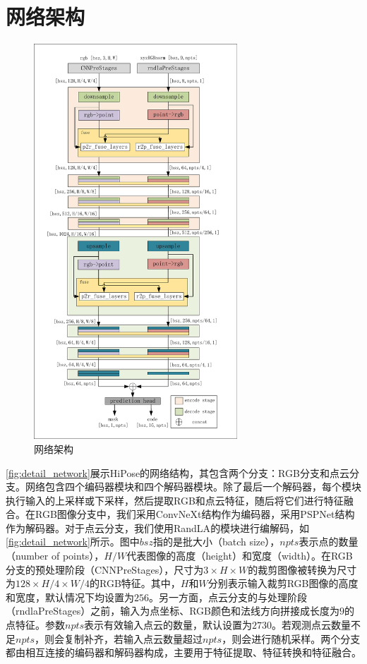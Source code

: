 \section{网络架构}

\begin{figure}[htbp]
    \centering
    \includegraphics[width=0.68\textwidth]{figure/hipose/network.pdf}
    \caption{网络架构}
    \label{fig:detail_network}
\end{figure}

\autoref{fig:detail_network}展示HiPose的网络结构，其包含两个分支：RGB分支和点云分支。网络包含四个编码器模块和四个解码器模块。除了最后一个解码器，每个模块执行输入的上采样或下采样，然后提取RGB和点云特征，随后将它们进行特征融合。在RGB图像分支中，我们采用ConvNeXt\cite{Liu2022ACF}结构作为编码器，采用PSPNet结构\cite{zhao2017pyramid}作为解码器。对于点云分支，我们使用RandLA\cite{hu2020randla}的模块进行编解码，如\autoref{fig:detail_network}所示。图中$bsz$指的是批大小（batch size），$npts$表示点的数量（number of points），$H/W$代表图像的高度（height）和宽度（width）。在RGB分支的预处理阶段（CNNPreStages），尺寸为$3 \times H \times W$的裁剪图像被转换为尺寸为$128 \times H/4 \times W/4$的RGB特征。其中，$H$和$W$分别表示输入裁剪RGB图像的高度和宽度，默认情况下均设置为$256$。另一方面，点云分支的与处理阶段（rndlaPreStages）之前，输入为点坐标、RGB颜色和法线方向拼接成长度为$9$的点特征。参数$npts$表示有效输入点云的数量，默认设置为$2730$。若观测点云数量不足$npts$，则会复制补齐，若输入点云数量超过$npts$，则会进行随机采样。两个分支都由相互连接的编码器和解码器构成，主要用于特征提取、特征转换和特征融合。

